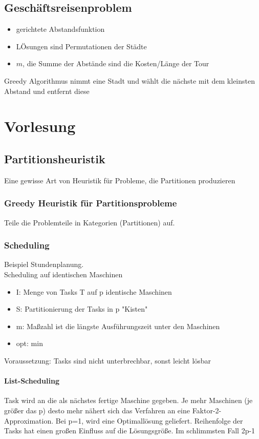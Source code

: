 \documentclass[ngerman]{scrartcl}
\begin{document}
\subsection*{Geschäftsreisenproblem}
\begin{itemize}
  \item gerichtete Abstandsfunktion
  \item LÖsungen sind Permutationen der Städte
  \item $ m $, die Summe der Abstände sind die Kosten/Länge der Tour
\end{itemize}
Greedy Algorithmus nimmt eine Stadt und wählt die nächste mit dem kleinsten Abstand und entfernt diese

\section{Vorlesung}
\subsection{Partitionsheuristik}
Eine gewisse Art von Heuristik für Probleme, die Partitionen produzieren
\subsubsection*{Greedy Heuristik für Partitionsprobleme}
Teile die Problemteile in Kategorien (Partitionen) auf.
\subsubsection{Scheduling}
Beispiel Stundenplanung. \\
Scheduling auf identischen Maschinen
\begin{itemize}
  \item I: Menge von Tasks T auf p identische Maschinen
  \item S: Partitionierung der Tasks in p "Kisten"
  \item m: Maßzahl ist die längste Ausführungszeit unter den Maschinen
  \item opt: min 
\end{itemize}
Voraussetzung: Tasks sind nicht unterbrechbar, sonst leicht lösbar

\paragraph{List-Scheduling} Task wird an die als nächstes fertige Maschine gegeben. Je mehr Maschinen (je größer das p) desto mehr nähert sich das Verfahren an eine Faktor-2-Approximation. Bei p=1, wird eine Optimallösung geliefert. Reihenfolge der Tasks hat einen großen Einfluss auf die Lösungsgröße. Im schlimmsten Fall 2p-1
\end{document}
